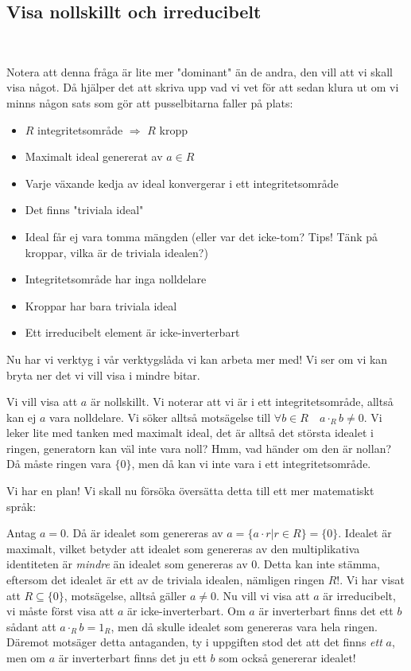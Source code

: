 \subsection{Visa nollskillt och irreducibelt}\hfill\\
\par\bigskip
\noindent Notera att denna fråga är lite mer "dominant" än de andra, den vill att vi skall visa något. Då hjälper det att skriva upp vad vi vet för att sedan klura ut om vi minns någon sats som gör att pusselbitarna faller på plats:
\par\bigskip
\begin{itemize}
  \item $R$ integritetsområde $\Rightarrow$ $R$ kropp
  \item Maximalt ideal genererat av $a\in R$
  \item Varje växande kedja av ideal konvergerar i ett integritetsområde
  \item Det finns "triviala ideal"
  \item Ideal får ej vara tomma mängden (eller var det icke-tom? Tips! Tänk på kroppar, vilka är de triviala idealen?)
  \item Integritetsområde har inga nolldelare
  \item Kroppar har bara triviala ideal
  \item Ett irreducibelt element är icke-inverterbart
\end{itemize}
\par\bigskip
\noindent Nu har vi verktyg i vår verktygslåda vi kan arbeta mer med! Vi ser om vi kan bryta ner det vi vill visa i mindre bitar.\par\bigskip
\noindent Vi vill visa att $a$ är nollskillt. Vi noterar att vi är i ett integritetsområde, alltså kan ej $a$ vara nolldelare. Vi söker alltså motsägelse till $\forall b\in R\quad a\cdot_R b \neq0$. Vi leker lite med tanken med maximalt ideal, det är alltså det största idealet i ringen, generatorn kan väl inte vara noll? Hmm, vad händer om den är nollan? Då måste ringen vara $\{0\}$, men då kan vi inte vara i ett integritetsområde.\par
\noindent Vi har en plan! Vi skall nu försöka översätta detta till ett mer matematiskt språk:\par
\noindent Antag $a = 0$. Då är idealet som genereras av $a = \{a\cdot r | r\in R\} = \{0\}$. Idealet är maximalt, vilket betyder att idealet som genereras av den multiplikativa identiteten är \textit{mindre} än idealet som genereras av 0. Detta kan inte stämma, eftersom det idealet är ett av de triviala idealen, nämligen ringen $R$!. Vi har visat att $R\subseteq\{0\}$, motsägelse, alltså gäller $a\neq0$.
\newpage
\noindent Nu vill vi visa att $a$ är irreducibelt, vi måste först visa att $a$ är icke-inverterbart. Om $a$ är inverterbart finns det ett $b$ sådant att $a\cdot_R b = 1_R$, men då skulle idealet som genereras vara hela ringen. Däremot motsäger detta antaganden, ty i uppgiften stod det att det finns \textit{ett} $a$, men om $a$ är inverterbart finns det ju ett $b$ som också genererar idealet!
\par\bigskip

